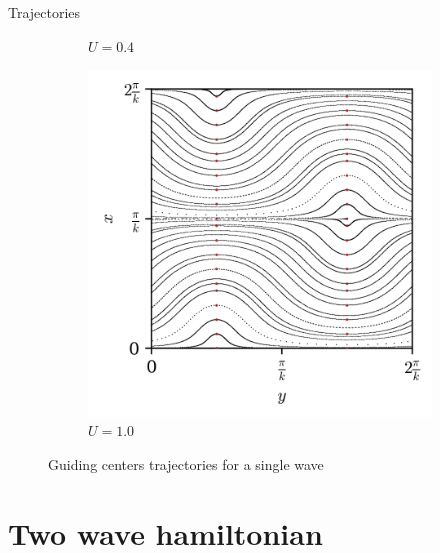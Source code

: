 \documentclass[10pt]{beamer}
\begin{document}
\begin{frame}{Trajectories}
\begin{figure}[h]
\begin{subfigure}[b]{0.3\textwidth}
    \caption{$U = 0.4$}
\end{subfigure}
\begin{subfigure}[b]{0.3\textwidth}
    \includegraphics[width=\textwidth]{graf_1onda/map2_data-map2_U_p1.0000.png}
    \caption{$U = 1.0$}
\end{subfigure}

\caption{Guiding centers trajectories for a single wave}
\end{figure}

\end{frame}



\section{Two wave hamiltonian}
\end{document}
